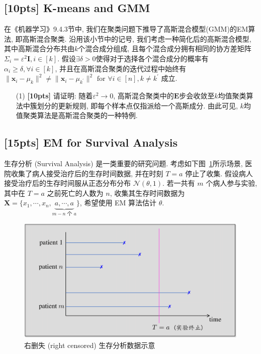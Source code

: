 \documentclass[a4paper,UTF8]{article}
\numberwithin{equation}{section}
\theoremstyle{definition}
\def \X {\mathbf{X}}
\def \x {\boldsymbol{x}}
\begin{document}
\subsection{[10pts] K-means and GMM}
在《机器学习》9.4.3节中, 我们在聚类问题下推导了高斯混合模型(GMM)的EM算法, 即高斯混合聚类. 沿用该小节中的记号, 我们考虑一种简化后的高斯混合模型, 
其中高斯混合分布共由$k$个混合成分组成, 且每个混合成分拥有相同的协方差矩阵$\Sigma_i = \varepsilon^2 \mathbf{I}, i \in [k]$.
假设$\exists \delta > 0$使得对于选择各个混合成分的概率有$\alpha_i \geq \delta, \forall i \in [k]$, 并且在高斯混合聚类的迭代过程中始终有
$\|\x_i - \mu_k\|^2 \neq \|\x_i - \mu_{k^\prime}\|^2 \text{ for } \forall i \in [n], k \neq k^\prime$ 成立.

\begin{itemize}
    \item[(1)] \textbf{[10pts]} 请证明: 随着$\varepsilon^2 \to 0$, 高斯混合聚类中的$\mathbf{E}$步会收敛至$k$均值聚类算法中簇划分的更新规则, 即每个样本点仅指派给一个高斯成分. 由此可见, $k$均值聚类算法是高斯混合聚类的一种特例.
\end{itemize}

\subsection{[15pts] EM for Survival Analysis}
生存分析 (Survival Analysis) 是一类重要的研究问题. 考虑如下图~\ref{fig:data}所示场景, 医院收集了病人接受治疗后的生存时间数据, 并在时刻 $T=a$ 停止了收集. 假设病人接受治疗后的生存时间服从正态分布分布 $\mathcal{N}(\theta, 1)$. 若一共有 $m$ 个病人参与实验, 其中在 $T=a$ 之前死亡的人数为 $n$, 收集其生存时间数据为 $\X = \{x_1, \cdots, x_n, \underbrace{a, \cdots, a}_{m-n \text{ 个 } a}\}$, 希望使用 EM 算法估计 $\theta$. 
\vskip -0.15in
\begin{figure}[h]
        \centering
        \includegraphics[width=.7\textwidth]{survival-analysis.pdf}
        \vskip -0.1in
        \caption{右删失 (right censored) 生存分析数据示意}
        \label{fig:data}
    \end{figure}
    
\end{document}
